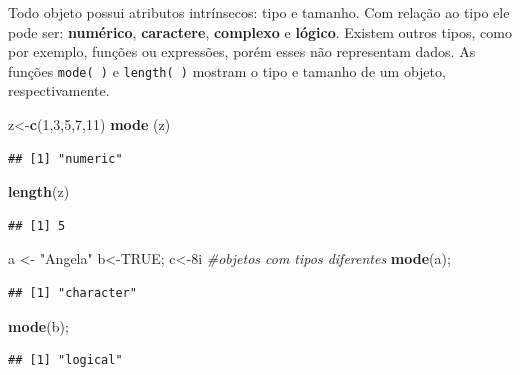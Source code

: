 \documentclass[]{book}
\newenvironment{Shaded}{\begin{snugshade}}{\end{snugshade}}
\newcommand{\CommentTok}[1]{\textcolor[rgb]{0.56,0.35,0.01}{\textit{#1}}}
\newcommand{\DecValTok}[1]{\textcolor[rgb]{0.00,0.00,0.81}{#1}}
\newcommand{\KeywordTok}[1]{\textcolor[rgb]{0.13,0.29,0.53}{\textbf{#1}}}
\newcommand{\NormalTok}[1]{#1}
\newcommand{\OtherTok}[1]{\textcolor[rgb]{0.56,0.35,0.01}{#1}}
\newcommand{\StringTok}[1]{\textcolor[rgb]{0.31,0.60,0.02}{#1}}
\begin{document}
Todo objeto possui atributos intrínsecos: tipo e tamanho. Com relação ao tipo ele pode ser: \textbf{numérico}, \textbf{caractere}, \textbf{complexo} e \textbf{lógico}. Existem outros tipos, como por exemplo, funções ou expressões, porém esses não representam dados.
As funções \texttt{mode(\ )} e \texttt{length(\ )} mostram o tipo e tamanho de um objeto, respectivamente.

\begin{Shaded}
\begin{Highlighting}[]
\NormalTok{z<-}\KeywordTok{c}\NormalTok{(}\DecValTok{1}\NormalTok{,}\DecValTok{3}\NormalTok{,}\DecValTok{5}\NormalTok{,}\DecValTok{7}\NormalTok{,}\DecValTok{11}\NormalTok{) }
\KeywordTok{mode}\NormalTok{ (z)}
\end{Highlighting}
\end{Shaded}

\begin{verbatim}
## [1] "numeric"
\end{verbatim}

\begin{Shaded}
\begin{Highlighting}[]
\KeywordTok{length}\NormalTok{(z)}
\end{Highlighting}
\end{Shaded}

\begin{verbatim}
## [1] 5
\end{verbatim}

\begin{Shaded}
\begin{Highlighting}[]
\NormalTok{a <-}\StringTok{ "Angela"}
\NormalTok{b<-}\OtherTok{TRUE}\NormalTok{; }
\NormalTok{c<-8i }\CommentTok{#objetos com tipos diferentes}
\KeywordTok{mode}\NormalTok{(a); }
\end{Highlighting}
\end{Shaded}

\begin{verbatim}
## [1] "character"
\end{verbatim}

\begin{Shaded}
\begin{Highlighting}[]
\KeywordTok{mode}\NormalTok{(b); }
\end{Highlighting}
\end{Shaded}

\begin{verbatim}
## [1] "logical"
\end{verbatim}
\end{document}
